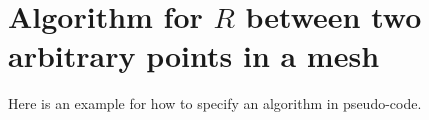 \documentclass[../thesis.tex]{subfiles}
\begin{document}
\chapter{Algorithm for $R$ between two arbitrary points in a mesh}
\cite{Fang23}
Here is an example for how to specify an algorithm in pseudo-code.

\newcommand{\str}[1]{\textsc{#1}}
\newcommand{\var}[1]{\textit{#1}}
\newcommand{\op}[1]{\textsl{#1}}
\def \ifempty#1{\def\temp{#1} \ifx\temp\empty }
\newcommand{\msg}[2]{\ensuremath{\ifempty{#2} [\str{#1}] \else [\str{#1}, {#2}] \fi}}
\newcommand{\tup}[1]{\ensuremath{\langle #1 \rangle}}
\newcommand{\nil}{\ensuremath{\bot}}
\newcommand{\false}{\textsc{false}\xspace}
\newcommand{\true}{\textsc{true}\xspace}

\newcommand\lastts{\var{lastts}\xspace}
\newcommand\nextts{\var{nextts}\xspace}
\newcommand\trusted{\var{trusted}\xspace}
\newcommand\newepoch{\var{newepoch}\xspace}
\newcommand\leader{\var{leader}\xspace}
\newcommand\ts{\var{ts}\xspace}
\newcommand{\CK}{\ensuremath{\mathcal{K}}\xspace}
\newcommand{\CP}{\ensuremath{\mathcal{P}}\xspace}
\newcommand{\CQ}{\ensuremath{\mathcal{Q}}\xspace}
\end{document}
